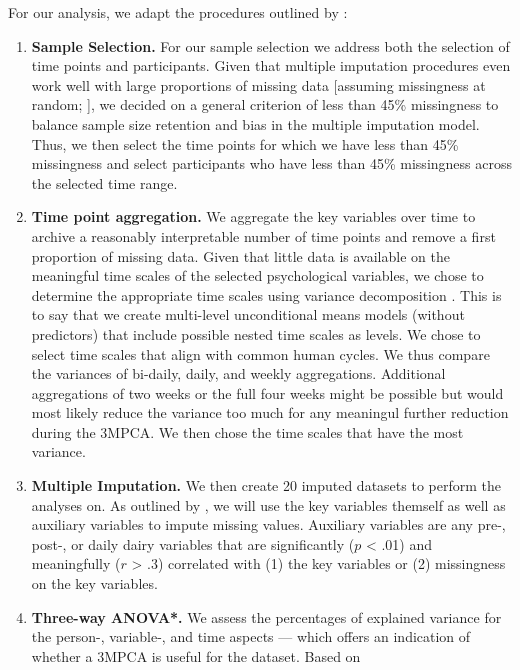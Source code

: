 \documentclass[]{article}
\providecommand{\tightlist}{%
\setlength{\itemsep}{0pt}\setlength{\parskip}{0pt}}
\begin{document}
For our analysis, we adapt the procedures outlined by
\citet{Monden2015}:

\begin{enumerate}
\def\labelenumi{\arabic{enumi}.}
\tightlist
\item
  \textbf{Sample Selection.} For our sample selection we address both
  the selection of time points and participants. Given that multiple
  imputation procedures even work well with large proportions of missing
  data {[}assuming missingness at random; \citet{Madley-Dowd2019}{]}, we
  decided on a general criterion of less than 45\% missingness to
  balance sample size retention and bias in the multiple imputation
  model. Thus, we then select the time points for which we have less
  than 45\% missingness and select participants who have less than 45\%
  missingness across the selected time range.
\item
  \textbf{Time point aggregation.} We aggregate the key variables over
  time to archive a reasonably interpretable number of time points and
  remove a first proportion of missing data. Given that little data is
  available on the meaningful time scales of the selected psychological
  variables, we chose to determine the appropriate time scales using
  variance decomposition \citep[e.g., see][]{Ram2014}. This is to say
  that we create multi-level unconditional means models (without
  predictors) that include possible nested time scales as levels. We
  chose to select time scales that align with common human cycles. We
  thus compare the variances of bi-daily, daily, and weekly
  aggregations. Additional aggregations of two weeks or the full four
  weeks might be possible but would most likely reduce the variance too
  much for any meaningul further reduction during the 3MPCA. We then
  chose the time scales that have the most variance.
\item
  \textbf{Multiple Imputation.} We then create 20 imputed datasets to
  perform the analyses on. As outlined by \citet{Monden2015}, we will
  use the key variables themself as well as auxiliary variables to
  impute missing values. Auxiliary variables are any pre-, post-, or
  daily dairy variables that are significantly (\(p\) \textless{} .01)
  and meaningfully (\(r\) \textgreater{} .3) correlated with (1) the key
  variables or (2) missingness on the key variables.
\item
  \textbf{Three-way ANOVA*.} We assess the percentages of explained
  variance for the person-, variable-, and time aspects --- which offers
  an indication of whether a 3MPCA is useful for the dataset. Based on

\end{enumerate}
\end{document}

